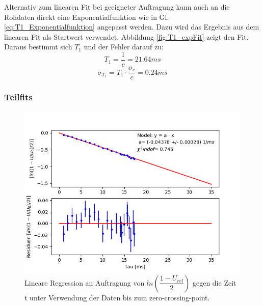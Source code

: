 \documentclass[12pt,a4paper]{article}
\begin{document}
Alternativ zum linearen Fit bei geeigneter Auftragung kann auch an die Rohdaten direkt eine Exponentialfunktion  wie in Gl. \ref{eq:T1_Exponentialfunktion} angepasst werden. Dazu wird das Ergebnis aus dem linearen Fit als Startwert verwendet. Abbildung \ref{fig:T1_expFit} zeigt den Fit. Daraus bestimmt sich $T_1$ und der Fehler darauf zu:
\begin{equation*}
T_1 = \dfrac{1}{c} = 21.64 ms
\end{equation*}
\begin{equation*}
\sigma _{T_1} = T_1 \cdot \dfrac{\sigma _c}{c} = 0.24 ms
\end{equation*}

\subsubsection{Teilfits}

\begin{figure}
\centering
\includegraphics[scale=0.7]{Bilder/T1_linTeilFit_halblog.PNG}
\caption{Lineare Regression an Auftragung von $ln\left(\dfrac{1-U_{rel}}{2}\right)$ gegen die Zeit t unter Verwendung der Daten bis zum zero-crossing-point.}
\label{fig:T1_linTeilFit}
\end{figure}
\end{document}
